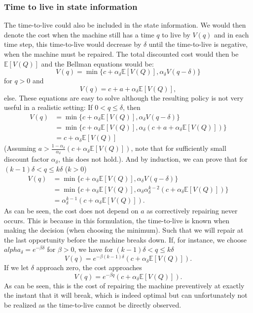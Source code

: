 \subsubsection{Time to live in state information}
The time-to-live could also be included in the state information.
We would then denote the cost when the machine still has a time $q$ to live by $V(q)$ and in each time step, this time-to-live would decrease by $\delta$ until the time-to-live is negative, when the machine must be repaired.
The total discounted cost would then be $\mathbb{E}[V(Q)]$ and the Bellman equations would be:
$$
V(q)=\min\{
c+\alpha_{\delta} \mathbb{E}[V(Q)],
\alpha_{\delta} V(q-\delta)
\}
$$
for $q>0$ and
$$
V(q)=c + a + \alpha_{\delta} \mathbb{E}[V(Q)],
$$
else.
These equations are easy to solve although the resulting policy is not very useful in a realistic setting:
If $0<q\leq\delta$, then 
\begin{equation}\begin{split}
V(q)&=\min\{
c+\alpha_{\delta} \mathbb{E}[V(Q)],\alpha_{\delta} V(q-\delta)\}\\
&=\min\{
c+\alpha_{\delta} \mathbb{E}[V(Q)],\alpha_{\delta}(c+a+\alpha_{\delta} \mathbb{E}[V(Q)])\}\\
&=c+\alpha_{\delta} \mathbb{E}[V(Q)]
\end{split}
\end{equation}
(Assuming $a>\frac{1-\alpha_\delta}{\alpha_\delta}(c+\alpha_\delta\mathbb{E}[V(Q)])$, note that for sufficiently small discount factor $\alpha_\delta$, this does not hold.).
And by induction, we can prove that for $(k-1)\delta<q\leq k\delta$ ($k>0$)
\begin{equation}\begin{split}
V(q)&=\min\{
c+\alpha_{\delta} \mathbb{E}[V(Q)],\alpha_{\delta} V(q-\delta)\}\\
&=\min\{
c+\alpha_{\delta} \mathbb{E}[V(Q)],\alpha_{\delta} \alpha_{\delta}^{k-2}(c+\alpha_\delta\mathbb{E}[V(Q)])\}\\
&=\alpha_{\delta}^{k-1}(c+\alpha_\delta\mathbb{E}[V(Q)]).
\end{split}
\end{equation}
As can be seen, the cost does not depend on $a$ as correctively repairing never occurs. This is because in this formulation, the time-to-live is known when making the decision (when choosing the minimum). Such that we will repair at the last opportunity before the machine breaks down.
If, for instance, we choose $alpha_\delta=e^{-\beta \delta}$ for $\beta>0$, we have for $(k-1)\delta<q\leq k\delta$
$$
V(q)=e^{-\beta(k-1)\delta}(c+\alpha_\delta\mathbb{E}[V(Q)]).
$$
If we let $\delta$ approach zero, the cost approaches 
$$
V(q)=e^{-\beta q}(c+\alpha_\delta\mathbb{E}[V(Q)]).
$$
As can be seen, this is the cost of repairing the machine preventively at exactly the instant that it will break, which is indeed optimal but can unfortunately not be realized as the time-to-live cannot be directly observed.